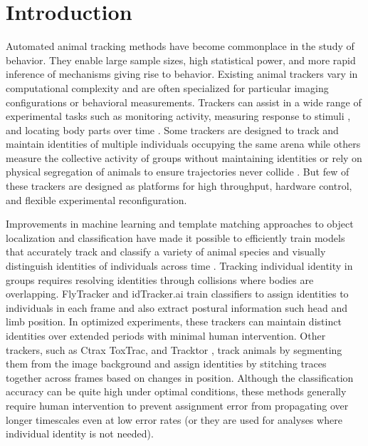 \documentclass[10pt,letterpaper]{article}
\begin{document}
\linenumbers

\section*{Introduction}
Automated animal tracking methods have become commonplace in the study of behavior. They enable large sample sizes, high statistical power, and more rapid inference of mechanisms giving rise to behavior. Existing animal trackers vary in computational complexity and are often specialized for particular imaging configurations or behavioral measurements. Trackers can assist in a wide range of experimental tasks such as monitoring activity, measuring response to stimuli \cite{Fry_TrackFly_2008,Donelson_High_2012}, and locating body parts over time \cite{Mathis_DeepLabCut_2018,Pereira_Fast_2018}. Some trackers are designed to track and maintain identities of multiple individuals occupying the same arena \cite{Prez-Escudero_idTracker_2014,Eyjolfsdottir_Detecting_2014,Rodriguez_ToxId_2017,romero-ferrero_2019} while others measure the collective activity of groups without maintaining identities or rely on physical segregation of animals to ensure trajectories never collide \cite{Ramot_The_2008,Swierczek_High_2011,Itskovits_A_2017,Scaplen_Automated_2019}. But few of these trackers are designed as platforms for high throughput, hardware control, and flexible experimental reconfiguration. 

Improvements in machine learning and template matching approaches to object localization and classification have made it possible to efficiently train models that accurately track and classify a variety of animal species and visually distinguish identities of individuals across time \cite{Eyjolfsdottir_Detecting_2014,Prez-Escudero_idTracker_2014,schneider_2018,romero-ferrero_2019}. Tracking individual identity in groups requires resolving identities through collisions where bodies are overlapping. FlyTracker and idTracker.ai train classifiers to assign identities to individuals in each frame and also extract postural information such head and limb position. In optimized experiments, these trackers can maintain distinct identities over extended periods with minimal human intervention. Other trackers, such as Ctrax ToxTrac, and Tracktor \cite{Branson_High_2009,Rodriguez_ToxId_2017,Sridhar_2019}, track animals by segmenting them from the image background and assign identities by stitching traces together across frames based on changes in position. Although the classification accuracy can be quite high under optimal conditions, these methods generally require human intervention to prevent assignment error from propagating over longer timescales even at low error rates (or they are used for analyses where individual identity is not needed). 
\end{document}

